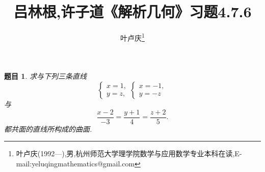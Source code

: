 \documentclass[a4paper]{article}
\newtheorem*{exe}{题目}
\newenvironment{exercise}
{\bigskip\begin{mdframed}\begin{exe}}
    {\end{exe}\end{mdframed}\bigskip}
\begin{document}
\title{\huge{\bf{吕林根,许子道《解析几何》习题4.7.6}}} \author{\small{叶卢庆\footnote{叶卢庆(1992---),男,杭州师范大学理学院数学与应用数学专业本科在读,E-mail:yeluqingmathematics@gmail.com}}}
\maketitle
\begin{exercise}
  求与下列三条直线
$$
\begin{cases}
  x=1,\\
y=z,
\end{cases}
\begin{cases}
  x=-1,\\
y=-z
\end{cases}
$$
与
$$
\frac{x-2}{-3}=\frac{y+1}{4}=\frac{z+2}{5}.
$$
都共面的直线所构成的曲面.
\end{exercise}
\end{document}
